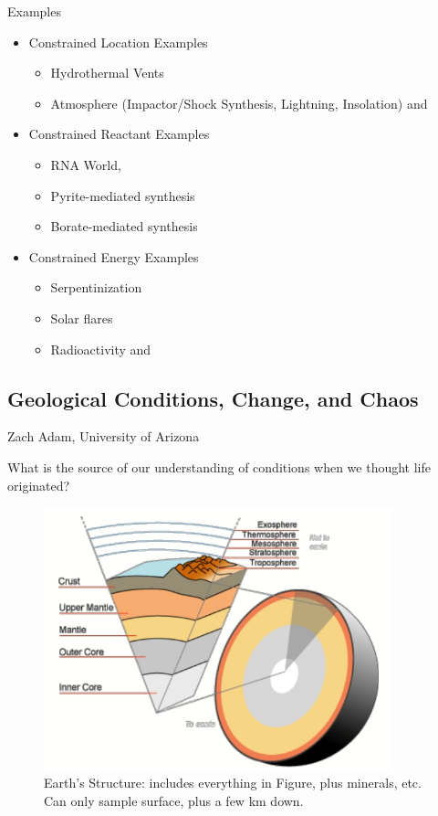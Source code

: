 \documentclass[]{article}
\begin{document}
Examples
\begin{itemize}
	\item Constrained Location Examples \begin{itemize}
		\item Hydrothermal Vents\cite{martin2006origin}
		\item Atmosphere (Impactor/Shock Synthesis, Lightning,
		Insolation)\cite{chyba1992endogenous} and \cite{miller1959organic}
	\end{itemize}
	\item Constrained Reactant Examples 
	\begin{itemize}
		\item RNA World\cite{powner2009synthesis},
		\item Pyrite-mediated synthesis\cite{wachtershauser1993cradle}
		\item Borate-mediated synthesis\cite{grew2011borate}
	\end{itemize}
	\item Constrained Energy Examples
	\begin{itemize}
		\item Serpentinization\cite{schrenk2013serpentinization}
		\item Solar flares\cite{airapetian2016prebiotic}
		\item Radioactivity\cite{yi2018radiolytic} and \cite{adam2018estimating}
	\end{itemize}
\end{itemize}
\subsection{Geological Conditions, Change, and Chaos}

Zach Adam, University of Arizona\cite{spencer2017growth}

What is the source of our understanding of conditions when we thought life originated?
\begin{figure}[H]
	\caption{Earth's Structure: includes everything in Figure, plus minerals, etc. Can only sample surface, plus a few km down.}\label{fig:EarthStructure} 
	\includegraphics[width=0.9\textwidth]{EarthStructure}
\end{figure}
\end{document}
